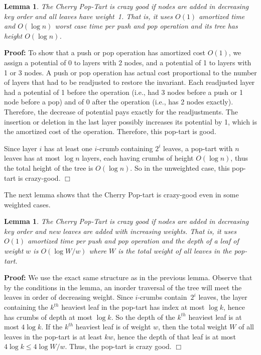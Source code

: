 \documentclass[11pt]{article}
\newtheorem{lemma}[theorem]{Lemma}
\newenvironment{proof}{\noindent\textbf{Proof: }\ignorespaces}
  {\hspace*{\fill}$\Box$\medskip}
\begin{document}
\begin{lemma}
The Cherry Pop-Tart is crazy good if nodes are added in decreasing
key order and all leaves have weight~1. That
is, it uses $O(1)$ amortized time and $O(\log n)$ worst case time per
push and pop operation and its tree has height $O(\log n)$. 
\end{lemma}
\begin{proof}
To show that a push or pop operation has amortized cost
$O(1)$, we assign a potential of 0 to layers with 2 nodes,
and a potential of 1 to layers with 1 or 3 nodes. A push or pop
operation has actual cost proportional to the number of layers that
had to be readjusted to restore the invariant. Each readjusted layer had
a potential of 1 before the operation (i.e., had 3 nodes before a push
or 1 node before a pop) and of 0 after the operation (i.e., has 2
nodes exactly). Therefore, the decrease of potential pays exactly for
the readjustments. The insertion or deletion in the last layer possibly
increases its potential by 1, which is the amortized cost of the
operation. Therefore, this pop-tart is good.

Since layer $i$ has at least one $i$-crumb containing $2^i$ leaves, a
pop-tart with $n$ leaves has at most $\log n$ layers, each having crumbs
of height $O(\log n)$, thus the total height of the tree is $O(\log n)$.
So in the unweighted case, this pop-tart is crazy-good.
\end{proof}

The next lemma shows that the Cherry Pop-tart is crazy-good even in
some weighted cases. 
\begin{lemma}\label{lem:cherry-pop-tart}
The Cherry Pop-Tart is crazy good if nodes are added in decreasing
key order and new leaves are added with increasing weights.
That is, it uses $O(1)$ amortized time per push and pop operation and
the depth of a leaf of weight $w$ is $O(\log W/w)$ where $W$ is the
total weight of all leaves in the pop-tart.
\end{lemma}
\begin{proof}
We use the exact same structure as in the previous lemma. Observe that
by the conditions in the lemma, an inorder traversal of the tree will
meet the leaves in order of decreasing weight. Since $i$-crumbs
contain~$2^i$ leaves, the layer containing the $k^{th}$ heaviest leaf in
the pop-tart has index at most $\log k$, hence has crumbs of depth at
most $\log k$. So the depth of the $k^{th}$ heaviest leaf is at most
$4\log k$. If the $k^{th}$ heaviest leaf is of weight $w$, then the
total weight $W$ of all leaves in the pop-tart is at least $kw$, hence
the depth of that leaf is at most $4 \log k \leq 4\log {W/w}$. Thus, the
pop-tart is crazy good.
\end{proof}
\end{document}
